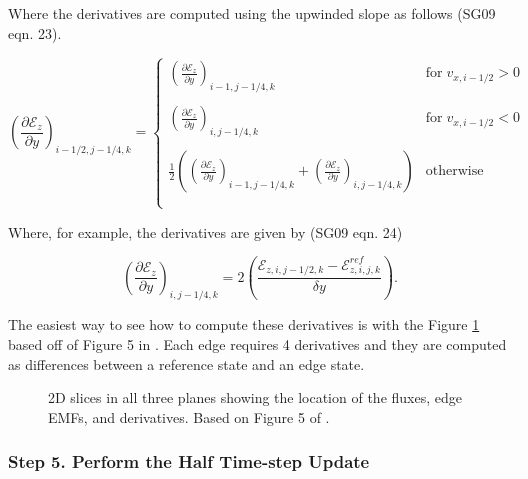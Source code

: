 Where the derivatives are computed using the upwinded slope as follows (SG09 eqn. 23).

\begin{equation}
    \label{eqn:emf-upwind-slope}
    \left( \frac{\partial \mathcal{E}_z }{\partial y} \right)_{i-1/2, j-1/4, k} =
        \begin{cases}
            \left( \frac{\partial \mathcal{E}_z }{\partial y} \right)_{i-1, j-1/4, k} & \text{for} \; v_{x, i-1/2} > 0
            \\
            \\
            \left( \frac{\partial \mathcal{E}_z }{\partial y} \right)_{i, j-1/4, k} & \text{for} \; v_{x, i-1/2} < 0
            \\
            \\
            \frac{1}{2} \left( \left( \frac{\partial \mathcal{E}_z }{\partial y} \right)_{i-1, j-1/4, k} + \left( \frac{\partial \mathcal{E}_z }{\partial y} \right)_{i, j-1/4, k} \right) & \text{otherwise}
            \\
            \\
        \end{cases}
\end{equation}

Where, for example, the derivatives are given by (SG09 eqn. 24)

\begin{equation}
    \label{eqn:emf-slope}
    \left( \frac{\partial \mathcal{E}_z }{\partial y} \right)_{i, j-1/4, k} =
    2 \left( \frac{\mathcal{E}_{z,i,j-1/2,k} - \mathcal{E}_{z,i,j,k}^{ref}}{\delta y} \right).
\end{equation}

The easiest way to see how to compute these derivatives is with the Figure \ref{fig:emf-graph} based off of Figure 5 in \cite{stone_athena_2008}. Each edge requires 4 derivatives and they are computed as differences between a reference state and an edge state.

\begin{figure}[ht!]
    \caption{2D slices in all three planes showing the location of the fluxes, edge EMFs, and derivatives. Based on Figure 5 of \cite{stone_athena_2008}.}
    \label{fig:emf-graph}
\end{figure}

\subsubsection{Step 5. Perform the Half Time-step Update}
\label{vlct:half-dt-update}

